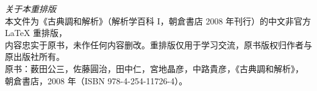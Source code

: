 \thispagestyle{empty}
\begin{center}
    \small
    \noindent\emph{关于本重排版}\\[0.5em]
    本文件为《古典調和解析》（解析学百科 I，朝倉書店 2008 年刊行）的中文非官方 \LaTeX{} 重排版，\\
    内容忠实于原书，未作任何内容删改。重排版仅用于学习交流，原书版权归作者与原出版社所有。\\
    \vspace{0.5cm}
    原书：薮田公三，佐藤圓治，田中仁，宮地晶彦，中路貴彦，《古典調和解析》，\\
    朝倉書店，2008 年（ISBN 978-4-254-11726-4）。
\end{center}
